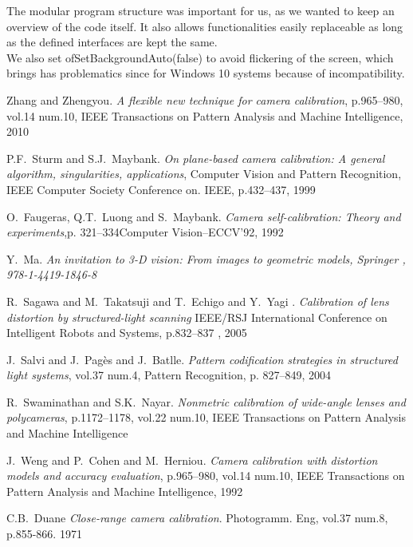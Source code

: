 \documentclass[journal,final,a4paper,twoside]{PS}
\begin{document}
The modular program structure was important for us, as we wanted to keep an overview of the code itself. It also allows functionalities easily replaceable as long as the defined interfaces are kept the same.
\\
We also set ofSetBackgroundAuto(false) to avoid flickering of the screen, which brings has problematics since for Windows 10 systems because of incompatibility. 




%

\begin{thebibliography}{1}
Zhang and Zhengyou. \emph{A flexible new technique for camera calibration}, p.965--980, vol.14 num.10, IEEE Transactions on Pattern Analysis and Machine Intelligence, 2010

P.F.~Sturm and S.J.~Maybank. \emph{On plane-based camera calibration: A general algorithm, singularities, applications}, Computer Vision and Pattern Recognition, IEEE Computer Society Conference on. IEEE, p.432--437, 1999

O.~Faugeras, Q.T.~Luong and S.~Maybank. \emph{Camera self-calibration: Theory and experiments},p. 321--334Computer Vision--ECCV'92, 1992

Y.~Ma. \emph{{An invitation to 3-D vision: From images to geometric models}, {Springer} , {978-1-4419-1846-8}}

R.~Sagawa and M.~Takatsuji and T.~Echigo and Y.~Yagi . \emph{Calibration of lens distortion by structured-light scanning} IEEE/RSJ International Conference on Intelligent Robots and Systems, p.832--837 , 2005

J.~Salvi and J.~Pag{\`e}s and J.~Batlle. \emph{Pattern codification strategies in structured light systems}, vol.37 num.4, Pattern Recognition, p. 827--849, 2004

R.~Swaminathan and S.K.~Nayar. \emph{Nonmetric calibration of wide-angle lenses and polycameras}, p.1172--1178, vol.22 num.10, IEEE Transactions on Pattern Analysis and Machine Intelligence

J.~Weng and P.~Cohen and M.~Herniou. \emph{Camera calibration with distortion models and accuracy evaluation}, p.965--980, vol.14 num.10, IEEE Transactions on Pattern Analysis and Machine Intelligence, 1992

C.B.~Duane  \emph{Close-range camera calibration}. Photogramm. Eng, vol.37 num.8, p.855-866. 1971


\end{thebibliography}
\end{document}
